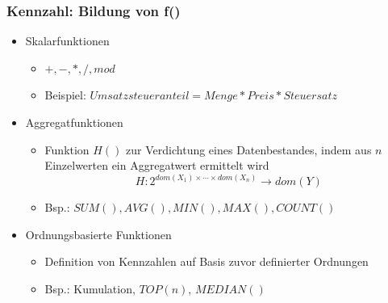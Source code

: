 
        \begin{frame}

        \frametitle{Kennzahl: Bildung von f()}
        \begin{itemize}
        \item Skalarfunktionen
          \begin{itemize}
          \item $+, -, *, /, mod$
          \item Beispiel: $Umsatzsteueranteil = Menge * Preis * Steuersatz$
          \end{itemize}
        \item Aggregatfunktionen
          \begin{itemize}
          \item Funktion $H()$ zur Verdichtung eines Datenbestandes, indem aus
            $n$ Einzelwerten ein Aggregatwert ermittelt wird
        $$ H: 2 ^{dom(X_1) \times \cdots \times  dom(X_n)} \to dom(Y)$$
        \item Bsp.: $SUM(), AVG(), MIN(), MAX(), COUNT()$
        \end{itemize}
        \item Ordnungsbasierte Funktionen
          \begin{itemize}
          \item Definition von Kennzahlen auf Basis zuvor definierter
            Ordnungen
          \item Bsp.: Kumulation, $TOP(n)$, $MEDIAN()$
          \end{itemize}
        \end{itemize}

        \end{frame}

